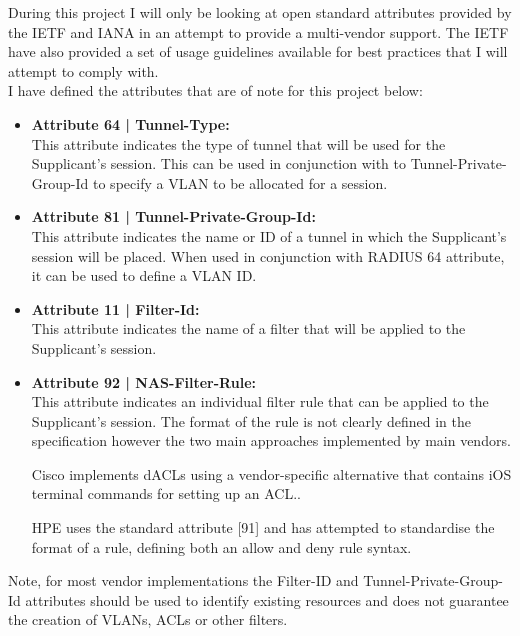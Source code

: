 During this project I will only be looking at open standard attributes \cite{radius_attributes_iana} provided by the IETF and IANA in an attempt to provide a multi-vendor support. The IETF have also provided a set of usage guidelines available for best practices that I will attempt to comply with.\cite{rfc_3580}\\
I have defined the attributes that are of note for this project below:
\begin{itemize} [leftmargin=*]
    \item [] \textbf{Attribute 64 | Tunnel-Type:}\\
    This attribute indicates the type of tunnel that will be used for the Supplicant's session. This can be used in conjunction with to Tunnel-Private-Group-Id to specify a VLAN to be allocated for a session.
    
    \item [] \textbf{Attribute 81 | Tunnel-Private-Group-Id:}\\
    This attribute indicates the name or ID of a tunnel in which the Supplicant's session will be placed. When used in conjunction with RADIUS 64 attribute, it can be used to define a VLAN ID.
    
    \item [] \textbf{Attribute 11 | Filter-Id:}\\
    This attribute indicates the name of a filter that will be applied to the Supplicant's session.\cite{juniper_filter_id}

    \item [] \textbf{Attribute 92 | NAS-Filter-Rule:}\\
    This attribute indicates an individual filter rule that can be applied to the Supplicant's session. The format of the rule is not clearly defined in the specification however the two main approaches implemented by main vendors. 
    
    Cisco implements dACLs using a vendor-specific alternative that contains iOS terminal commands for setting up an ACL.\cite{cisco_filter_rule}. 
    
    HPE uses the standard attribute [91] and has attempted to standardise the format of a rule, defining both an allow and deny rule syntax. \cite{hpe_filter_rule}
\end{itemize}

Note, for most vendor implementations the Filter-ID and Tunnel-Private-Group-Id attributes should be used to identify existing resources and does not guarantee the creation of VLANs, ACLs or other filters.

